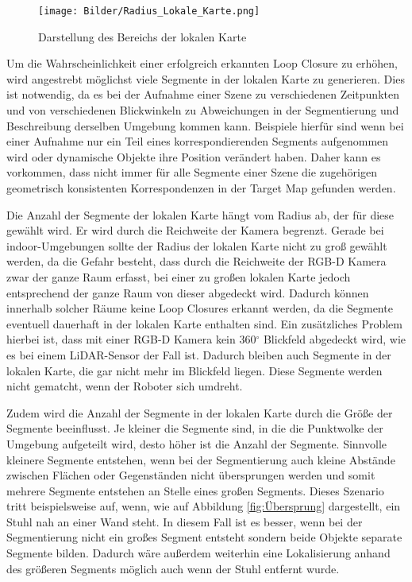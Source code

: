 \begin{figure}
	\centering
	\texttt{[image: Bilder/Radius\_Lokale\_Karte.png]}
	\caption{Darstellung des Bereichs der lokalen Karte}
	\label{fig:lokaleKarte}
\end{figure} 

Um die Wahrscheinlichkeit einer erfolgreich erkannten Loop Closure zu erhöhen, wird angestrebt möglichst viele Segmente in der lokalen Karte zu generieren. Dies ist notwendig, da es bei der Aufnahme einer Szene zu verschiedenen Zeitpunkten und von verschiedenen Blickwinkeln zu Abweichungen in der Segmentierung und Beschreibung derselben Umgebung kommen kann. Beispiele hierfür sind wenn bei einer Aufnahme nur ein Teil eines korrespondierenden Segments aufgenommen wird oder dynamische Objekte ihre Position verändert haben. Daher kann es vorkommen, dass nicht immer für alle Segmente einer Szene die zugehörigen geometrisch konsistenten Korrespondenzen in der Target Map gefunden werden.

Die Anzahl der Segmente der lokalen Karte hängt vom Radius ab, der für diese gewählt wird. Er wird durch die Reichweite der Kamera begrenzt. Gerade bei indoor-Umgebungen sollte der Radius der lokalen Karte nicht zu groß gewählt werden, da die Gefahr besteht, dass durch die Reichweite der RGB-D Kamera zwar der ganze Raum erfasst, bei einer zu großen lokalen Karte jedoch entsprechend der ganze Raum von dieser abgedeckt wird. Dadurch können innerhalb solcher Räume keine Loop Closures erkannt werden, da die Segmente eventuell dauerhaft in der lokalen Karte enthalten sind. Ein zusätzliches Problem hierbei ist, dass mit einer RGB-D Kamera kein 360$ ^\circ $ Blickfeld abgedeckt wird, wie es bei einem LiDAR-Sensor der Fall ist. Dadurch bleiben auch Segmente in der lokalen Karte, die gar nicht mehr im Blickfeld liegen. Diese Segmente  werden nicht gematcht, wenn der Roboter sich umdreht.

Zudem wird die Anzahl der Segmente in der lokalen Karte durch die Größe der Segmente beeinflusst. Je kleiner die Segmente sind, in die die Punktwolke der Umgebung aufgeteilt wird, desto höher ist die Anzahl der Segmente. Sinnvolle kleinere Segmente entstehen, wenn bei der Segmentierung auch kleine Abstände zwischen Flächen oder Gegenständen nicht übersprungen werden und somit mehrere Segmente entstehen an Stelle eines großen Segments. Dieses Szenario tritt beispielsweise auf, wenn, wie auf Abbildung \ref{fig:Übersprung} dargestellt, ein Stuhl nah an einer Wand steht. In diesem Fall ist es besser, wenn bei der Segmentierung nicht ein großes Segment entsteht sondern beide Objekte separate Segmente bilden. Dadurch wäre außerdem weiterhin eine Lokalisierung anhand des größeren Segments möglich auch wenn der Stuhl entfernt wurde. 

